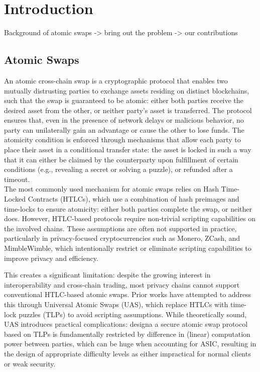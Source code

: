 
\section{Introduction}

\begin{todobox}
    Background of atomic swaps -> bring out the problem -> our contributions
\end{todobox}

\subsection{Atomic Swaps}
An atomic cross-chain swap is a cryptographic protocol that enables two mutually distrusting parties to exchange assets residing on distinct blockchains, such that the swap is guaranteed to be atomic: either both parties receive the desired asset from the other, or neither party’s asset is transferred. The protocol ensures that, even in the presence of network delays or malicious behavior, no party can unilaterally gain an advantage or cause the other to lose funds. The atomicity condition is enforced through mechanisms that allow each party to place their asset in a conditional transfer state: the asset is locked in such a way that it can either be claimed by the counterparty upon fulfillment of certain conditions (e.g., revealing a secret or solving a puzzle), or refunded after a timeout. \\
The most commonly used mechanism for atomic swaps relies on Hash Time-Locked Contracts (HTLCs), which use a combination of hash preimages and time-locks to ensure atomicity: either both parties complete the swap, or neither does. However, HTLC-based protocols require non-trivial scripting capabilities on the involved chains. These assumptions are often not supported in practice, particularly in privacy-focused cryptocurrencies such as Monero, ZCash, and MimbleWimble, which intentionally restrict or eliminate scripting capabilities to improve privacy and efficiency.

This creates a significant limitation: despite the growing interest in interoperability and cross-chain trading, most privacy chains cannot support conventional HTLC-based atomic swaps. Prior works have attempted to address this through Universal Atomic Swaps (UAS), which replace HTLCs with time-lock puzzles (TLPs) to avoid scripting assumptions. While theoretically sound, UAS introduces practical complications: designa a secure atomic swap protocol based on TLPs is fundamentally restricted by difference in (linear) computation power between parties, which can be huge when accounting for ASIC, resulting in the design of appropriate difficulty levels as either impractical for normal clients or weak security.

